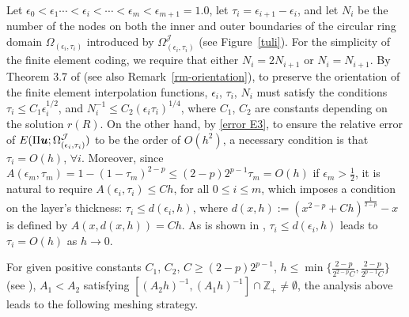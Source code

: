 \documentclass[12pt]{article}
\renewcommand{\vec}[1]{\mbox{\boldmath$#1$}}
\numberwithin{equation}{section}
\begin{document}
Let $\epsilon_0< \epsilon_1 \cdots < \epsilon_i < \cdots< \epsilon_{m}<
\epsilon_{m+1}=1.0$, let $\tau_{i}= \epsilon_{i+1} -\epsilon_i$,
and let $N_i$ be the number of the nodes on both the inner and outer boundaries
of the circular ring domain $\Omega_{(\epsilon_i,\tau_i)}$ introduced by
$\Omega^{\mathcal{J}}_{(\epsilon_i,\tau_i)}$ (see
Figure~\ref{tuli}). For the simplicity of the finite element coding, we
require that either $N_i=2N_{i+1}$ or $N_i=N_{i+1}$. By Theorem 3.7 of \cite{detp}
(see also Remark~\ref{rm-orientation}), to preserve the orientation of the
finite element interpolation
functions, $\epsilon_i$, $\tau_i$, $N_i$ must satisfy the conditions
$\tau_i\le C_1\epsilon_i^{1/2}$, and $N_i^{-1} \leq C_2(\epsilon_i
\tau_i)^{1/4}$, where $C_1$, $C_2$ are constants depending on the solution
$r(R)$. On the other hand, by \eqref{error E3}, to ensure the relative error of
$E(\Pi \vec{u};\Omega^\mathcal{J}_{(\epsilon_i,\tau_i)})$ to be the order of $O(h^2)$,
a necessary condition is that $\tau_i = O(h)$, $\forall i$. Moreover, since
$A(\epsilon_m, \tau_m)=1-(1-\tau_m)^{2-p}\le (2-p)2^{p-1}\tau_m=O(h)$ if
$\epsilon_m>\frac{1}{2}$,
it is natural to require $A(\epsilon_i, \tau_i)\le Ch$, for all $0 \le i \le m$,
which imposes a condition on the layer's thickness: $\tau_i \le d(\epsilon_i,h)$,
where $d(x,h):=(x^{2-p}+Ch)^{\frac{1}{2-p}}-x$ is defined by $A(x,d(x,h))=Ch$.
As is shown in \cite{SuLiRectan}, $\tau_i\le d(\epsilon_i,h)$ leads to
$\tau_i=O(h)$ as $h \rightarrow 0$.

For given positive constants $C_1$, $C_2$, $C\ge (2-p)2^{p-1}$, $h\le
\min\{\frac{2-p}{2^{2-p}C}, \frac{2-p}{2^{p-1}C}\}$ (see \cite{SuLiRectan}),
$A_1<A_2$ satisfying $[(A_2h)^{-1},(A_1h)^{-1}]\cap \mathbb{Z}_+ \ne \emptyset$,
the analysis above leads to the following meshing strategy.
\end{document}
